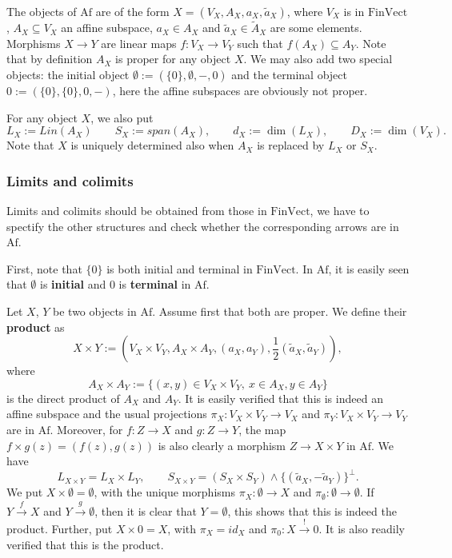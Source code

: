 \documentclass[12pt]{article}
\theoremstyle{definition}
\theoremstyle{remark}
\def \Af{\mathrm{Af}}
\def \FV{\mathrm{FinVect}}
\def\bX{ X}
\def\bY{ Y}
\def\bZ{Z}
\begin{document}
The objects of $\Af$ are of the form $X=(V_X,A_X,a_X,\tilde a_X)$, where $V_X$ is in
$\FV$, $A_X\subseteq V_X$ an affine subspace, $a_X\in A_X$ and $\tilde a_X\in \tilde A_X$
are some elements. Morphisms $X\to Y$ are linear maps $f:V_X\to V_Y$ such that
$f(A_X)\subseteq A_Y$. Note that by definition $A_X$ is proper for any object $X$. We may
also add
two special objects: the initial object $\emptyset:=(\{0\}, \emptyset, -, 0)$ and the terminal
object $0:=(\{0\},\{0\},0,-)$, here the affine subspaces are obviously not proper.

For any object $X$, we also put 
\[
L_X:=Lin(A_X)\qquad S_X:=span(A_X),\qquad  d_X:=\dim(L_X),\qquad D_X:=\dim(V_X).
\]
Note that $X$ is
uniquely determined also when $A_X$ is replaced by $L_X$ or $S_X$. 


\subsubsection{Limits and colimits}

Limits and colimits should be obtained from those in $\FV$, we have to spectify the other
structures and check  whether the corresponding arrows are in $\Af$. 

First, note that $\{0\}$ is both initial and terminal in $\FV$. In $\Af$, it is easily
seen that $\emptyset$ is \textbf{initial} and $0$ is \textbf{terminal} in $\Af$. 

Let $\bX$, $\bY$ be two objects in $\Af$. Assume first that both are proper. We define
their \textbf{product} as
\[
\bX\times \bY:=(V_\bX\times V_\bY, A_\bX\times A_\bY, (a_X,a_Y), \frac12(\tilde a_X,\tilde
a_Y)),
\]
where 
\[
A_\bX\times A_\bY:=\{(x,y)\in V_\bX\times V_\bY,\ x\in A_\bX, y\in A_\bY\}
\]
is the direct product of $A_\bX$ and $A_\bY$. It is easily verified that this is indeed an
affine subspace and the usual projections $\pi_\bX:V_\bX\times V_\bY\to V_\bX$ and $\pi_\bY:V_\bX\times
V_\bY\to V_\bY$ are in $\Af$. Moreover, for $f:\bZ\to \bX$  and $g:\bZ\to \bY$, the map
$f\times g(z)=(f(z),g(z))$ is also clearly a morphism $\bZ\to \bX\times\bY$  in $\Af$. 
We have
\[
L_{X\times Y}=L_X\times L_Y,\qquad S_{X\times Y}= (S_X\times S_Y)\wedge \{(\tilde
a_X,-\tilde a_Y)\}^\perp.
\]
We put $X\times \emptyset=\emptyset$, with the unique morphisms $\pi_X:\emptyset \to X$
and $\pi_{\emptyset}:\emptyset \to \emptyset$. If $Y\xrightarrow{f}X$ and
$Y\xrightarrow{g} \emptyset$, then it is clear that $Y=\emptyset$, this shows that this is
indeed the product. Further, put  $X\times 0=X$, with $\pi_X=id_X$  and
$\pi_0: X\xrightarrow{!}0$. It is also readily verified that this is the product.
\end{document}
